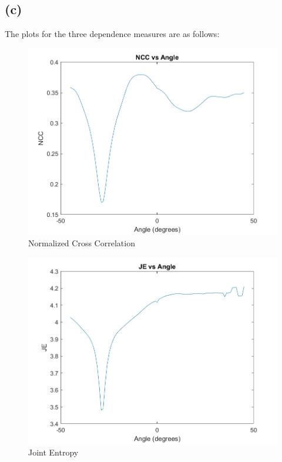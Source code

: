 \documentclass{article}
\begin{document}
\newpage
\subsection*{(c)}

The plots for the three dependence measures are as follows:
\begin{figure}[H]
\centering
\includegraphics[scale=0.3]{./Q5/NCC_vs_Angle.jpg}
\caption{Normalized Cross Correlation}
\end{figure}

\begin{figure}[H]
\centering
\includegraphics[scale=0.3]{./Q5/JE_vs_Angle.jpg}
\caption{Joint Entropy}
\end{figure}
\end{document}
